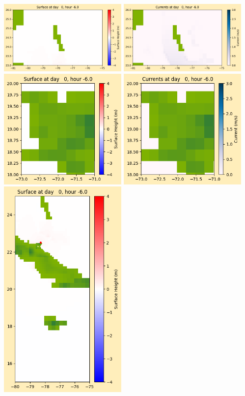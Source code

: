 \documentclass[11pt]{article}
\begin{document}
\vskip 10pt 
\includegraphics[width=0.475\textwidth]{frame0011fig1003.png}
\includegraphics[width=0.475\textwidth]{frame0011fig1004.png}
\vskip 10pt 
\includegraphics[width=0.475\textwidth]{frame0011fig1005.png}
\includegraphics[width=0.475\textwidth]{frame0011fig1006.png}
\vskip 10pt 
\includegraphics[width=0.475\textwidth]{frame0011fig1007.png}
\end{document}
